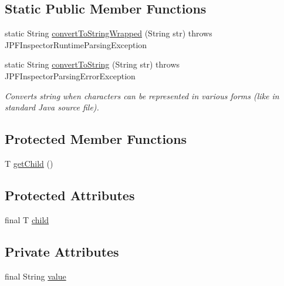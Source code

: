 \subsection*{Static Public Member Functions}
\begin{DoxyCompactItemize}
\item 
static String \hyperlink{classgov_1_1nasa_1_1jpf_1_1inspector_1_1server_1_1expression_1_1expressions_1_1_expression_state_value_const_string_a3559714b6521a9fa35801a193809d1cd}{convert\+To\+String\+Wrapped} (String str)  throws J\+P\+F\+Inspector\+Runtime\+Parsing\+Exception 
\item 
static String \hyperlink{classgov_1_1nasa_1_1jpf_1_1inspector_1_1server_1_1expression_1_1expressions_1_1_expression_state_value_const_string_abb21f3660648ae1f210355c7e6807810}{convert\+To\+String} (String str)  throws J\+P\+F\+Inspector\+Parsing\+Error\+Exception 
\begin{DoxyCompactList}\small\item\em Converts string when characters can be represented in various forms (like in standard Java source file). \end{DoxyCompactList}\end{DoxyCompactItemize}
\subsection*{Protected Member Functions}
\begin{DoxyCompactItemize}
\item 
T \hyperlink{classgov_1_1nasa_1_1jpf_1_1inspector_1_1server_1_1expression_1_1_expression_state_unary_operator_a150bac338d6557f79ca185d3f6ad6e06}{get\+Child} ()
\end{DoxyCompactItemize}
\subsection*{Protected Attributes}
\begin{DoxyCompactItemize}
\item 
final T \hyperlink{classgov_1_1nasa_1_1jpf_1_1inspector_1_1server_1_1expression_1_1_expression_state_unary_operator_a66041b1f569a361549e28a00f7ca5f2f}{child}
\end{DoxyCompactItemize}
\subsection*{Private Attributes}
\begin{DoxyCompactItemize}
\item 
final String \hyperlink{classgov_1_1nasa_1_1jpf_1_1inspector_1_1server_1_1expression_1_1expressions_1_1_expression_state_value_const_string_ac4c2de5d71c2fa57cb8029d1fde8e437}{value}
\end{DoxyCompactItemize}


